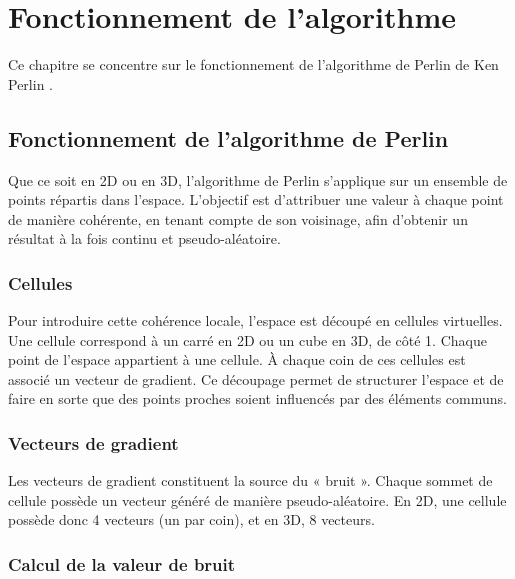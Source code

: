 \section{Fonctionnement de l'algorithme}

Ce chapitre se concentre sur le fonctionnement de l'algorithme de Perlin de Ken Perlin \cite{PerlinNoise}.

\subsection{Fonctionnement de l'algorithme de Perlin} 
Que ce soit en 2D ou en 3D, l’algorithme de Perlin s’applique sur un ensemble de points répartis dans l’espace. 
L’objectif est d’attribuer une valeur à chaque point de manière cohérente, en tenant compte de son voisinage, afin d’obtenir un résultat à la fois continu et pseudo-aléatoire.

\subsubsection{Cellules} 
Pour introduire cette cohérence locale, l’espace est découpé en cellules virtuelles.
Une cellule correspond à un carré en 2D ou un cube en 3D, de côté 1. Chaque point de l’espace appartient à une cellule.
À chaque coin de ces cellules est associé un vecteur de gradient. 
Ce découpage permet de structurer l’espace et de faire en sorte que des points proches soient influencés par des éléments communs.

\subsubsection{Vecteurs de gradient}

Les vecteurs de gradient constituent la source du « bruit ».
Chaque sommet de cellule possède un vecteur généré de manière pseudo-aléatoire.
En 2D, une cellule possède donc 4 vecteurs (un par coin), et en 3D, 8 vecteurs.

\subsubsection{Calcul de la valeur de bruit}

